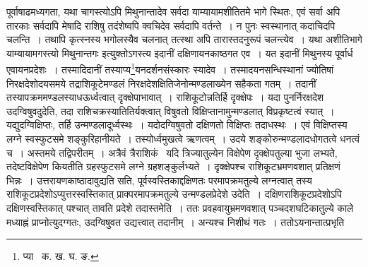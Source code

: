 \documentclass[11pt, openany]{book}
\begin{document}
\noindent पूर्वाषाढमध्यगता, यथा चागस्त्योऽपि मिथुनान्तादेव सर्वदा याम्यायामशीतितमे भागे स्थितः, एवं सर्वा अपि तारकाः सर्वदापि मेषादि राशिषु तदंशेष्वपि क्वचिदेव सर्वदापि वर्तन्ते~। न पुनः स्वस्थानात् कदाचिदपि चलन्ति~। तथापि कृत्स्नस्य भगोलस्यैव चलनात् तत्स्था अपि तारास्तदनुरूपं चलन्त्येव~। यथा {\qt अशीतिभागे याम्यायामगस्त्यो मिथुनान्तगः} इत्युक्तोऽगस्त्य इदानीं दक्षिणायनकाष्ठगत 
एव~। यत इदानीं मिथुनस्य पूर्वार्ध एवायनप्रदेशः~। तस्मादिदानीं तस्याप्य\renewcommand{\thefootnote}{१}\footnote{प्या \textendash\ क. ख. घ. ङ.}यनदर्शनसंस्कारः स्यादेव~। तस्मादयनसन्धिस्थानां ज्योतिषां निरक्षदेशोदयसमये तद्राशिकूटेमण्डलं निरक्षदेशक्षितिजेनोन्मण्डलाख्येन सहैकता गतम्~। तदानीं तस्यापक्रममण्डलस्याधऊर्ध्वत्वात् दृक्क्षेपाभावात्~। राशिकूटोन्नतिर्हि दृक्क्षेपः~। यदा पुनर्निरक्षदेश उदग्विषुवदुदेति, तदा राशिचक्रस्यातितिर्यक्त्वात् विषुवतो विक्षिप्तानामुन्मण्डलात् विप्रकृष्टत्वं स्यात्~। यद्युदग्विक्षिप्तः, तर्हि उन्मण्डलादूर्ध्वस्थः~। यदोदग्विषुवतो दक्षिणतो विक्षिप्तः तदाधस्थः~। एवं विक्षिप्तस्य लग्ने स्वस्फुटसमे शङ्कुरिहानीयते~। तस्योर्ध्वमुखत्वे ऋणत्वम्~। उदये शङ्कोरुन्मण्डलादधोगतत्वे 
धनत्वं च~। अस्तमये तद्विपरीतम्~। अत्रैवं त्रैराशिकं \textendash\ यदि त्रिज्यातुल्येन विक्षेपेण दृक्क्षेपतुल्या भुजा लभ्यते, तदेष्टविक्षेपेण कियतीति ग्रहस्फुटसमे लग्ने ग्रहशङ्कुर्लभ्यते~। दृक्क्षेपश्च राशिकूटभ्रमणवशात् प्रतिक्षणं भिन्नः~। उत्तरायणकाष्ठादावुद्यति सति, पूर्वस्वस्तिकाद्दक्षिणतः परमापक्रमतुल्ये लग्नत्वात् तस्य राशिकूटप्रदेशोऽप्युत्तरस्वस्तिकात् प्राक्परमापक्रमतुल्ये उन्मण्डलप्रेदेशे उदेति~। दक्षिणराशिकूटप्रदेशोऽपि दक्षिणस्वस्तिकात् पश्चात् तावति प्रदेशे तदास्तमेति~। ततः प्रवहवायुभ्रमणवशात् पञ्चदशघटिकातुल्ये काले मध्याह्नं प्राप्नोत्युदग्गतः, उदग्विषुवत उद्यत्त्वात् तदानीम्~। अन्यश्च निशीथं गतः~। ततोऽयनान्तात्प्रभृति 

\newpage
\end{document}
